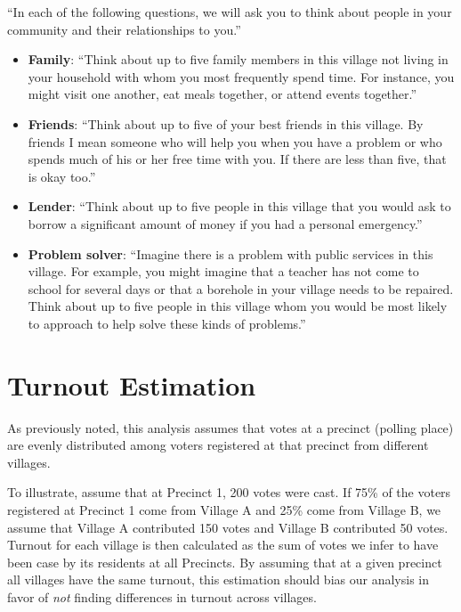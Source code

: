 \documentclass[12pt]{article}
\begin{document}
\begin{appendix}
``In each of the following questions, we will ask you to think about people in your community and their relationships to you.''
\begin{itemize}

\item {\bf Family}: ``Think about up to five family members in this village not living in your household with whom you most frequently spend time. For instance, you might visit one another, eat meals together, or attend events together.''

\item {\bf Friends}:	``Think about up to five of your best friends in this village. By friends I mean someone who will help you when you have a problem or who spends much of his or her free time with you. If there are less than five, that is okay too.''

\item {\bf Lender}: ``Think about up to five people in this village that you would ask to borrow a significant amount of money if you had a personal emergency.''

\item {\bf Problem solver}: ``Imagine there is a problem with public services in this village. For example, you might imagine that a teacher has not come to school for several days or that a borehole in your village needs to be repaired. Think about up to five people in this village whom you would be most likely to approach to help solve these kinds of problems.''
\end{itemize}



\section{Turnout Estimation}\label{appendix_turnout_extrapolation}

As previously noted, this analysis assumes that votes at a precinct (polling place) are evenly distributed among voters registered at that precinct from different villages.

To illustrate, assume that at Precinct 1, 200 votes were cast. If 75\% of the voters registered at Precinct 1 come from Village A and 25\% come from Village B, we assume that Village A contributed 150 votes and Village B contributed 50 votes. Turnout for each village is then calculated as the sum of votes we infer to have been case by its residents at all Precincts. By assuming that at a given precinct all villages have the same turnout, this estimation should bias our analysis in favor of \emph{not} finding differences in turnout across villages.


\end{appendix}
\end{document}
